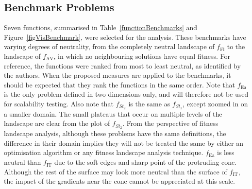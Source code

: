 \documentclass[conference]{IEEEtran}
\begin{document}
\subsection{Benchmark Problems}
\label{visualBenchmarks}
Seven functions, summarised in Table~\ref{functionBenchmarks} and Figure~\ref{figVisBenchmark}, were selected for the analysis. These benchmarks have varying degrees of neutrality, from the completely neutral landscape of $f_{\text{Fl}}$  to the landscape of $f_{\text{AV}}$, in which no neighbouring solutions have equal fitness. For reference, the functions were ranked from most to least neutral, as identified by the authors. When the proposed measures are applied to the benchmarks, it should be expected that they rank the functions in the same order. Note that $f_{\text{Ea}}$ is the only problem defined in two dimensions only, and will therefore not be used for scalability testing. Also note that $f_{\textit{St}_2}$ is the same as $f_{\textit{St}_1}$, except zoomed in on a smaller domain. The small plateaus that occur on multiple levels of the landscape are clear from the plot of $f_{\textit{St}_2}$. From the perspective of fitness landscape analysis, although these problems have the same definitions, the difference in their domain implies they will not be treated the same by either an optimisation algorithm or any fitness landscape analysis technique. $f_{\text{Ea}}$ is less neutral than $f_{\text{IT}}$ due to the soft edges and sharp point of the protruding cone. Although the rest of the surface may look more neutral than the surface of $f_{\text{IT}}$, the impact of the gradients near the cone cannot be appreciated at this scale.
\end{document}
